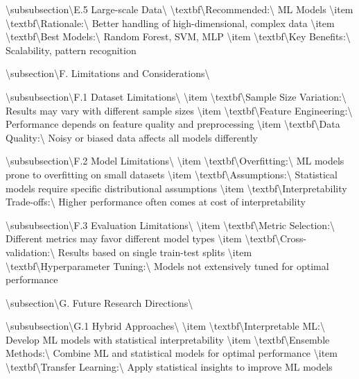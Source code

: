 \documentclass[11pt,a4paper]{article}
\begin{document}
\textbackslash{}subsubsection\textbackslash{}{E.5 Large-scale Data\textbackslash{}}
\textbackslash{}textbf\textbackslash{}{Recommended:\textbackslash{}} ML Models
\textbackslash{}item \textbackslash{}textbf\textbackslash{}{Rationale:\textbackslash{}} Better handling of high-dimensional, complex data
\textbackslash{}item \textbackslash{}textbf\textbackslash{}{Best Models:\textbackslash{}} Random Forest, SVM, MLP
\textbackslash{}item \textbackslash{}textbf\textbackslash{}{Key Benefits:\textbackslash{}} Scalability, pattern recognition

\textbackslash{}subsection\textbackslash{}{F. Limitations and Considerations\textbackslash{}}

\textbackslash{}subsubsection\textbackslash{}{F.1 Dataset Limitations\textbackslash{}}
\textbackslash{}item \textbackslash{}textbf\textbackslash{}{Sample Size Variation:\textbackslash{}} Results may vary with different sample sizes
\textbackslash{}item \textbackslash{}textbf\textbackslash{}{Feature Engineering:\textbackslash{}} Performance depends on feature quality and preprocessing
\textbackslash{}item \textbackslash{}textbf\textbackslash{}{Data Quality:\textbackslash{}} Noisy or biased data affects all models differently

\textbackslash{}subsubsection\textbackslash{}{F.2 Model Limitations\textbackslash{}}
\textbackslash{}item \textbackslash{}textbf\textbackslash{}{Overfitting:\textbackslash{}} ML models prone to overfitting on small datasets
\textbackslash{}item \textbackslash{}textbf\textbackslash{}{Assumptions:\textbackslash{}} Statistical models require specific distributional assumptions
\textbackslash{}item \textbackslash{}textbf\textbackslash{}{Interpretability Trade-offs:\textbackslash{}} Higher performance often comes at cost of interpretability

\textbackslash{}subsubsection\textbackslash{}{F.3 Evaluation Limitations\textbackslash{}}
\textbackslash{}item \textbackslash{}textbf\textbackslash{}{Metric Selection:\textbackslash{}} Different metrics may favor different model types
\textbackslash{}item \textbackslash{}textbf\textbackslash{}{Cross-validation:\textbackslash{}} Results based on single train-test splits
\textbackslash{}item \textbackslash{}textbf\textbackslash{}{Hyperparameter Tuning:\textbackslash{}} Models not extensively tuned for optimal performance

\textbackslash{}subsection\textbackslash{}{G. Future Research Directions\textbackslash{}}

\textbackslash{}subsubsection\textbackslash{}{G.1 Hybrid Approaches\textbackslash{}}
\textbackslash{}item \textbackslash{}textbf\textbackslash{}{Interpretable ML:\textbackslash{}} Develop ML models with statistical interpretability
\textbackslash{}item \textbackslash{}textbf\textbackslash{}{Ensemble Methods:\textbackslash{}} Combine ML and statistical models for optimal performance
\textbackslash{}item \textbackslash{}textbf\textbackslash{}{Transfer Learning:\textbackslash{}} Apply statistical insights to improve ML models
\end{document}
